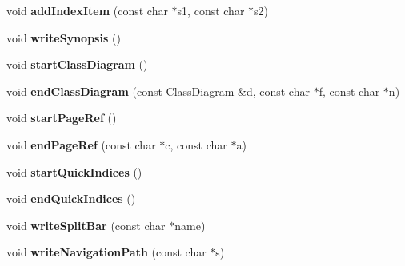 \begin{DoxyCompactItemize}
\item 
\hypertarget{class_output_list_a3810699d4deafedb9c887394aaedb0af}{void {\bfseries add\-Index\-Item} (const char $\ast$s1, const char $\ast$s2)}\label{class_output_list_a3810699d4deafedb9c887394aaedb0af}

\item 
\hypertarget{class_output_list_acba0caaf7ea5f4acb9b4bf3ccbf2ee68}{void {\bfseries write\-Synopsis} ()}\label{class_output_list_acba0caaf7ea5f4acb9b4bf3ccbf2ee68}

\item 
\hypertarget{class_output_list_ab9f199144725218464219039e2e7284e}{void {\bfseries start\-Class\-Diagram} ()}\label{class_output_list_ab9f199144725218464219039e2e7284e}

\item 
\hypertarget{class_output_list_a85eb98a2abcc5acd52fe8fd1bc43d326}{void {\bfseries end\-Class\-Diagram} (const \hyperlink{class_class_diagram}{Class\-Diagram} \&d, const char $\ast$f, const char $\ast$n)}\label{class_output_list_a85eb98a2abcc5acd52fe8fd1bc43d326}

\item 
\hypertarget{class_output_list_acb1f8019fc7ab54bdba19c92ef4a223d}{void {\bfseries start\-Page\-Ref} ()}\label{class_output_list_acb1f8019fc7ab54bdba19c92ef4a223d}

\item 
\hypertarget{class_output_list_acfa5dfc6f9fbbf61ddcf987046642cc9}{void {\bfseries end\-Page\-Ref} (const char $\ast$c, const char $\ast$a)}\label{class_output_list_acfa5dfc6f9fbbf61ddcf987046642cc9}

\item 
\hypertarget{class_output_list_a1003d38afed51e3e932a61be3b2d71a4}{void {\bfseries start\-Quick\-Indices} ()}\label{class_output_list_a1003d38afed51e3e932a61be3b2d71a4}

\item 
\hypertarget{class_output_list_a8ccfa7b4cc697673db66d95470901da6}{void {\bfseries end\-Quick\-Indices} ()}\label{class_output_list_a8ccfa7b4cc697673db66d95470901da6}

\item 
\hypertarget{class_output_list_aa08d5576403aaf7dbdadd40cfdd2ccd7}{void {\bfseries write\-Split\-Bar} (const char $\ast$name)}\label{class_output_list_aa08d5576403aaf7dbdadd40cfdd2ccd7}

\item 
\hypertarget{class_output_list_a73bd5b677298d5d38c3adeee45889d82}{void {\bfseries write\-Navigation\-Path} (const char $\ast$s)}\label{class_output_list_a73bd5b677298d5d38c3adeee45889d82}


\end{DoxyCompactItemize}

